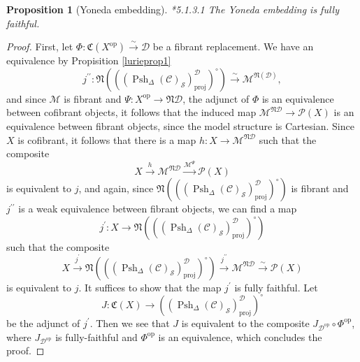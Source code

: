 \documentclass[leqno]{article}
\numberwithin{equation}{subsection}
\theoremstyle{plain}   %
\newtheorem{prop}[equation]{Proposition}
\theoremstyle{remark}
\theoremstyle{plain}
\newcommand{\op}{\ensuremath{\mathrm{op}}}
\newcommand{\M}{\ensuremath{\mathcal{M}}}
\newcommand{\Pre}{\ensuremath{\mathcal{P}}}
\newcommand{\setS}{\ensuremath{\mathscr{S}}}
\newcommand{\spsh}{\ensuremath{\operatorname{Psh}_\Delta(\mathcal{C})}}
\begin{document}
\begin{prop}[Yoneda embedding]\cite{htt}*{5.1.3.1}
	The Yoneda embedding is fully faithful.
\end{prop}
\begin{proof} 
	First, let \(\Phi:\mathfrak{C}(X^\op)\xrightarrow{\sim} \mathcal{D}\) be a fibrant replacement.  We have an equivalence by Propisition \ref{lurieprop1} 
	\[j^{\prime\prime}: \mathfrak{N}\left(\left((\spsh_\setS)^\mathcal{D}_\mathrm{proj}\right)^\circ\right) \xrightarrow{\sim} \M^{\mathfrak{N}(\mathcal{D})}, \]
	and since \(\M\) is fibrant and \(\Psi:X^\op \to \mathfrak{N}\mathcal{D}\), the adjunct of \(\Phi\) is an equivalence between cofibrant objects, it follows that the induced map \(\M^{\mathfrak{N}\mathcal{D}}\to \Pre(X)\) is an equivalence between fibrant objects, since the model structure is Cartesian.  Since \(X\) is cofibrant, it follows that there is a map \(h:X\to \M^{\mathfrak{N}\mathcal{D}}\) such that the composite
	\[X \xrightarrow{h} \M^{\mathfrak{N}\mathcal{D}} \xrightarrow{\M^{\Psi}} \Pre(X)\]
	is equivalent to \(j\), and again, since \(\mathfrak{N}\left(\left((\spsh_\setS)^\mathcal{D}_\mathrm{proj}\right)^\circ\right)\) is fibrant and \(j^{\prime\prime}\) is a weak equivalence between fibrant objects, we can find a map 
	\[j^\prime:X\to \mathfrak{N}\left(\left((\spsh_\setS)^\mathcal{D}_\mathrm{proj}\right)^\circ\right)\]
	such that the composite 
	\[X\xrightarrow{j^\prime} \mathfrak{N}\left(\left((\spsh_\setS)^\mathcal{D}_\mathrm{proj}\right)^\circ\right) \xrightarrow{j^{\prime\prime}} \M^{\mathfrak{N}\mathcal{D}} \xrightarrow{\sim} \Pre(X)\]
	is equivalent to \(j\).
	It suffices to show that the map \(j^\prime\) is fully faithful.  Let 
	\[J:\mathfrak{C}(X) \to \left((\spsh_\setS)^\mathcal{D}_\mathrm{proj}\right)^\circ\]
	be the adjunct of \(j^\prime\).  Then we see that \(J\) is equivalent to the composite \(J_{\mathcal{D^\op}}\circ \Phi^\op\), where \(J_{\mathcal{D^\op}}\) is fully-faithful and \(\Phi^\op\) is an equivalence, which concludes the proof.	
\end{proof}
\end{document}

